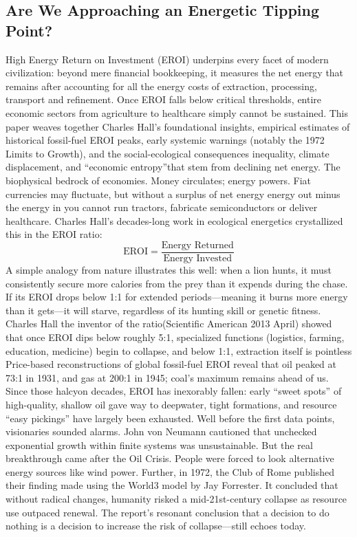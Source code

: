 \documentclass[a4paper,12pt]{article}
\begin{document}
\subsection{Are We Approaching an Energetic Tipping Point?}
High Energy Return on Investment (EROI) underpins every facet of modern civilization: beyond mere financial bookkeeping, it measures the net energy that remains after accounting for all the energy costs of extraction, processing, transport and refinement.  Once EROI falls below critical thresholds, entire economic sectors from agriculture to healthcare simply cannot be sustained.  This paper weaves together Charles Hall’s foundational insights, empirical estimates of historical fossil-fuel EROI peaks, early systemic warnings (notably the 1972 Limits to Growth), and the social-ecological consequences inequality, climate displacement, and “economic entropy”that stem from declining net energy.
The biophysical bedrock of economies. Money circulates; energy powers.  Fiat currencies may fluctuate, but without a surplus of net energy energy out minus the energy in you cannot run tractors, fabricate semiconductors or deliver healthcare.  Charles Hall’s decades-long work in ecological energetics crystallized this in the EROI ratio:
\[
\text{EROI} = \frac{\text{Energy Returned}}{\text{Energy Invested}}
\]
A simple analogy from nature illustrates this well: when a lion hunts, it must consistently secure more calories from the prey than it expends during the chase. If its EROI drops below 1:1 for extended periods—meaning it burns more energy than it gets—it will starve, regardless of its hunting skill or genetic fitness.
Charles Hall the inventor of the ratio(Scientific American 2013 April) showed that once EROI dips below roughly 5:1, specialized functions (logistics, farming, education, medicine) begin to collapse, and below 1:1, extraction itself is pointless Price-based reconstructions of global fossil-fuel EROI reveal that oil peaked at 73:1 in 1931, and gas at 200:1 in 1945; coal’s maximum remains ahead of us.  Since those halcyon decades, EROI has inexorably fallen: early “sweet spots” of high-quality, shallow oil gave way to deepwater, tight formations, and resource “easy pickings” have largely been exhausted.
Well before the first data points, visionaries sounded alarms.  John von Neumann cautioned that unchecked exponential growth within finite systems was unsustainable.  But the real breakthrough came after the Oil Crisis. People were forced to look alternative energy sources like wind power. Further, in 1972, the Club of Rome published their finding made using the World3 model by Jay Forrester. It concluded that without radical changes, humanity risked a mid-21st-century collapse as resource use outpaced renewal.  The report’s resonant conclusion that a decision to do nothing is a decision to increase the risk of collapse—still echoes today.
\end{document}
